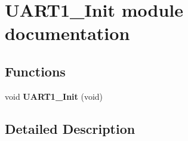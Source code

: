 \hypertarget{group___u_a_r_t1___init__module}{}\section{U\+A\+R\+T1\+\_\+\+Init module documentation}
\label{group___u_a_r_t1___init__module}
\subsection*{Functions}
\begin{DoxyCompactItemize}
\item 
void {\bfseries U\+A\+R\+T1\+\_\+\+Init} (void)\hypertarget{group___u_a_r_t1___init__module_ga5c01e95ec3c881cdd00e311327126693}{}\label{group___u_a_r_t1___init__module_ga5c01e95ec3c881cdd00e311327126693}

\end{DoxyCompactItemize}


\subsection{Detailed Description}
